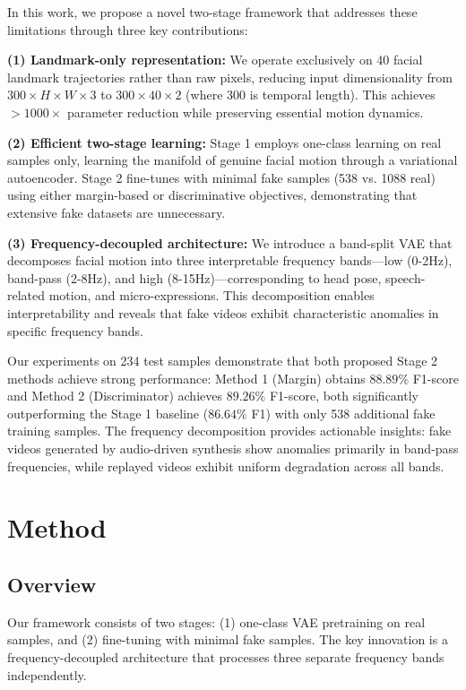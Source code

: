 \documentclass[11pt,twocolumn]{article}
\begin{document}
In this work, we propose a novel two-stage framework that addresses these limitations through three key contributions:

\textbf{(1) Landmark-only representation:} We operate exclusively on 40 facial landmark trajectories rather than raw pixels, reducing input dimensionality from $300 \times H \times W \times 3$ to $300 \times 40 \times 2$ (where 300 is temporal length). This achieves $>1000\times$ parameter reduction while preserving essential motion dynamics.

\textbf{(2) Efficient two-stage learning:} Stage 1 employs one-class learning on real samples only, learning the manifold of genuine facial motion through a variational autoencoder. Stage 2 fine-tunes with minimal fake samples (538 vs. 1088 real) using either margin-based or discriminative objectives, demonstrating that extensive fake datasets are unnecessary.

\textbf{(3) Frequency-decoupled architecture:} We introduce a band-split VAE that decomposes facial motion into three interpretable frequency bands—low (0-2Hz), band-pass (2-8Hz), and high (8-15Hz)—corresponding to head pose, speech-related motion, and micro-expressions. This decomposition enables interpretability and reveals that fake videos exhibit characteristic anomalies in specific frequency bands.

Our experiments on 234 test samples demonstrate that both proposed Stage 2 methods achieve strong performance: Method 1 (Margin) obtains $88.89\%$ F1-score and Method 2 (Discriminator) achieves $89.26\%$ F1-score, both significantly outperforming the Stage 1 baseline ($86.64\%$ F1) with only 538 additional fake training samples. The frequency decomposition provides actionable insights: fake videos generated by audio-driven synthesis show anomalies primarily in band-pass frequencies, while replayed videos exhibit uniform degradation across all bands.

\section{Method}
\label{sec:method}

\subsection{Overview}

Our framework consists of two stages: (1) one-class VAE pretraining on real samples, and (2) fine-tuning with minimal fake samples. The key innovation is a frequency-decoupled architecture that processes three separate frequency bands independently.
\end{document}
